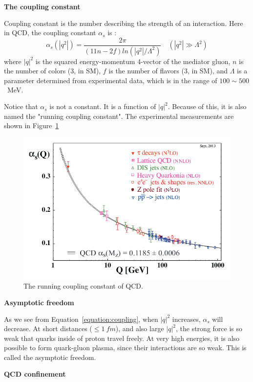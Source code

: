 {\bf The coupling constant}

Coupling constant is the number describing the strength of an interaction. 
Here in QCD, the coupling constant $\alpha_{s}$ is :
\begin{equation}
\alpha_{s}(|q^2|) = \frac{2\pi}{(11n-2f)ln(|q^2|/\Lambda^2)}   \quad (|q^2| \gg \Lambda^2)
\label{equation:coupling}
\end{equation}
where  $|q|^2$ is the squared energy-momentum 4-vector of the mediator gluon, $n$ is the number of colors (3, in SM), 
$f$ is the number of flavors (3, in SM), and $\Lambda$ is a parameter determined from 
experimental data, which is in the range of $100 {\sim} 500$~MeV. 

Notice that $\alpha_{s}$ is not a constant. It is a function of $|q|^2$. Because of this, it is also 
named the "running coupling constant".  The experimental measurements are shown 
in Figure~\ref{figs:coupling}

\begin{figure}[htb]
\centering
\includegraphics[width=.7\textwidth]{figures/alphasrunning.png}
\caption{The running coupling constant of QCD. }
\label{figs:coupling}
\end{figure}  

 
{\bf Asymptotic freedom}

As we see from Equation~\ref{equation:coupling}, 
when $|q|^2$ increases, $\alpha_{s}$ will decrease. 
At short distances (${\leq}1~fm$), and also large $|q|^2$, the strong force 
is so weak that quarks inside of proton travel freely.  At very high energies, 
it is also possible to form quark-gluon plasma, since their interactions are so weak. 
This is called the asymptotic freedom. 

{\bf QCD confinement}


